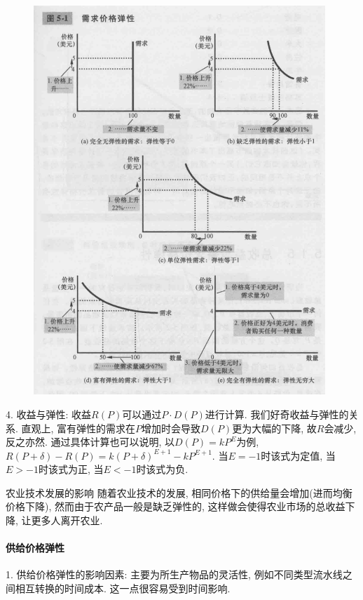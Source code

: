 \begin{figure}[H]
	\centering
	\includegraphics[width=11cm]{attachment/Fig5_1.png}
\end{figure}

4. 收益与弹性: 收益$R(P)$可以通过$P\cdot D(P)$进行计算. 我们好奇收益与弹性的关系. 直观上, 富有弹性的需求在$P$增加时会导致$D(P)$更为大幅的下降, 故$R$会减少, 反之亦然. 通过具体计算也可以说明, 以$D(P)=kP^{E}$为例, $R(P+\delta)-R(P)=k(P+\delta)^{E+1}-kP^{E+1}$. 当$E=-1$时该式为定值, 当$E>-1$时该式为正, 当$E<-1$时该式为负. 

\begin{example}{农业技术发展的影响}
	随着农业技术的发展, 相同价格下的供给量会增加(进而均衡价格下降), 然而由于农产品一般是缺乏弹性的, 这样做会使得农业市场的总收益下降, 让更多人离开农业. 
\end{example}

\paragraph{供给价格弹性}

1. 供给价格弹性的影响因素: 主要为所生产物品的灵活性, 例如不同类型流水线之间相互转换的时间成本. 这一点很容易受到时间影响. 

